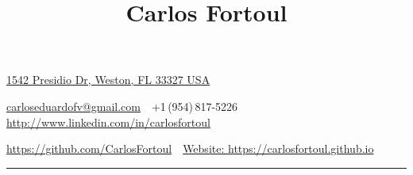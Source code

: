 \documentclass[letterpaper,MMMyyyy,nonstop]{simpleresumecv}
\newcommand{\CVAuthor}{Carlos Fortoul}
\newcommand{\CVWebpage}{http://www.linkedin.com/in/carlosfortoul}
\begin{document}

\title{\CVAuthor}
\begin{subtitle}
\href{https://www.google.com/maps/dir/''/1542+Presidio+Dr,+Weston,+FL+33327/data=!4m5!4m4!1m0!1m2!1m1!1s0x88d90a57450cc935:0x260f9cb86d3576bf?sa=X&ved=0ahUKEwisur3Ije3OAhVCHB4KHafxBEEQwwUIHTAA}
{1542 Presidio Dr, Weston, FL 33327 USA}
\par
\href{mailto:carloseduardofv@gmail.com}
{carloseduardofv@gmail.com}
\,\SubBulletSymbol\,
+1\,(954)\,817-5226
\,\SubBulletSymbol\,
\href{\CVWebpage}
{\CVWebpage}

\href{https://github.com/CarlosFortoul}
{https://github.com/CarlosFortoul}
\,\SubBulletSymbol\,
\href{https://carlosfortoul.github.io}
{Website: https://carlosfortoul.github.io}

\rule{\textwidth}{1pt}
\end{subtitle}
\vspace{-5mm}
\end{document}
